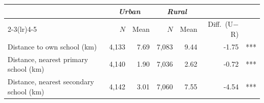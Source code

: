 \begin{tabular}{lrrrrrr}
   \tabularnewline \midrule \midrule
 & \multicolumn{2}{c}{\textit{Urban}} & \multicolumn{2}{c}{\textit{Rural}} & & \\
\cmidrule(lr){2-3}\cmidrule(lr){4-5}
 & $N$ & Mean & $N$ & Mean & Diff.\ (U$-$R) & \\
\midrule
Distance to own school (km) & 4,133 & 7.69 & 7,083 & 9.44 & -1.75 & *** \\
Distance, nearest primary school (km) & 4,140 & 1.90 & 7,036 & 2.62 & -0.72 & *** \\
Distance, nearest secondary school (km) & 4,142 & 3.01 & 7,060 & 7.55 & -4.54 & *** \\
\bottomrule
\end{tabular}
